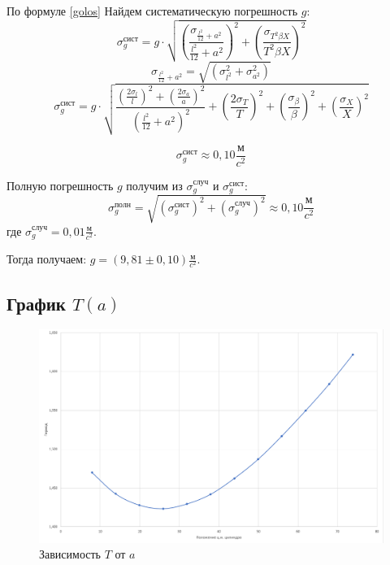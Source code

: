 	По формуле \eqref{golos} Найдем систематическую погрешность $g$:
	\begin{equation}
		\sigma_g^\text{сист} = g\cdot \sqrt{\left(\frac{\sigma_{\frac{l^2}{12}+a^2}}{\frac{l^2}{12}+a^2}\right)^2+\left(\frac{\sigma_{T^2 \beta X}}{T^2\beta X}\right)^2}
	\end{equation}
	\begin{equation}
		\sigma_{\frac{l^2}{12}+a^2} = \sqrt{\left(\sigma_{l^2}^2+\sigma_{a^2}^2 \right)}
	\end{equation}
	\begin{equation}
		\sigma_g^\text{сист} =  g\cdot\sqrt{\frac{\left(\frac{2\sigma_l}{l} \right)^2 + \left(\frac{2\sigma_a}{a}\right)^2}{\left(\frac{l^2}{12}+a^2 \right)^2} + \left(\frac{2\sigma_T}{T}\right)^2+\left(\frac{\sigma_{\beta}}{\beta} \right)^2 + \left(\frac{\sigma_{X}}{X} \right)^2}		
	\end{equation}
	
	
	\begin{equation}
		\sigma_g^\text{сист} \approx 0,10 \frac{\text{м}}{c^2}
	\end{equation}
	
	
	Полную погрешность $g$ получим из $\sigma_g^\text{случ}$ и $\sigma_g^\text{сист}$:
	\begin{equation}
		\sigma_g^\text{полн} = \sqrt{(\sigma_g^\text{сист})^2+(\sigma_g^\text{случ})^2}\approx 0,10\frac{\text{м}}{c^2}	\end{equation}	
	где $\sigma_g^\text{случ} = 0,01 \frac{\text{м}}{c^2}   $.
	
	Тогда получаем: $g=\left( 9,81\pm 0,10\right) \frac{\text{м}}{c^2}$.
	
	\subsection{График $T(a)$}
	\begin{figure}[h!]
		\includegraphics[scale=0.43]{graph}
		\caption{Зависимость $ T $ от $ a $}
		\label{graph}
	\end{figure}
	
